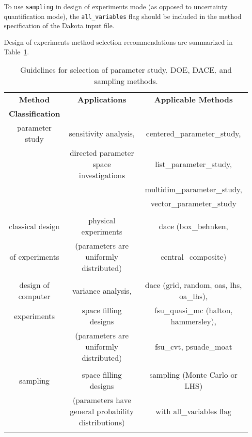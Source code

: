 To use \texttt{sampling} in design of experiments mode (as opposed to 
uncertainty quantification mode), the \texttt{all\_variables} flag
should be included in the method specification of the Dakota input
file.

Design of experiments method selection recommendations are summarized
in Table~\ref{dace:usage:table}.

\begin{table}[hbp]
\centering
\caption{Guidelines for selection of parameter study, DOE, DACE, and
sampling methods.}
\label{dace:usage:table}\vspace{2mm}
\begin{tabular}{|c|c|c|}
\hline
\textbf{Method} & \textbf{Applications} & \textbf{Applicable Methods} \\
\textbf{Classification} & & \\
\hline
parameter study & sensitivity analysis,                       & centered\_parameter\_study, \\
                & directed parameter space investigations     & list\_parameter\_study, \\
                &                                             & multidim\_parameter\_study, \\
                &                                             & vector\_parameter\_study \\
                   &                                             & \\
\hline
classical design & physical experiments                       & dace (box\_behnken, \\
of experiments   & (parameters are uniformly distributed)     & central\_composite) \\
                   &                                             & \\
\hline
design of computer & variance analysis,                       & dace (grid, random,
                                                                oas, lhs, oa\_lhs), \\
experiments        & space filling designs                    & fsu\_quasi\_mc (halton, 
                                                                hammersley), \\
                   & (parameters are uniformly distributed)   & fsu\_cvt, psuade\_moat \\
                   &                                             & \\
\hline
sampling           & space filling designs                    & sampling (Monte Carlo or LHS) \\
                   & (parameters have general probability distributions) & with all\_variables flag \\
                   &                                             & \\
\hline
\end{tabular}
\end{table}
